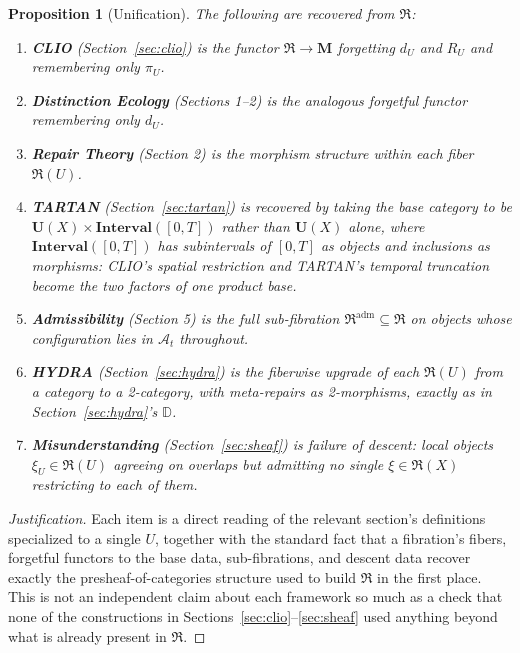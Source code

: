 \documentclass[11pt]{article}
\theoremstyle{plain}
\newtheorem{proposition}[theorem]{Proposition}
\theoremstyle{definition}
\theoremstyle{remark}
\begin{document}
\begin{proposition}[Unification]
\label{prop:unification}
The following are recovered from $\mathfrak{R}$:
\begin{enumerate}[itemsep=2pt]
\item \textbf{CLIO} (Section~\ref{sec:clio}) is the functor $\mathfrak{R} \to \mathbf{M}$ forgetting $d_U$ and $R_U$ and remembering only $\pi_U$.
\item \textbf{Distinction Ecology} (Sections 1--2) is the analogous forgetful functor remembering only $d_U$.
\item \textbf{Repair Theory} (Section 2) is the morphism structure within each fiber $\mathfrak{R}(U)$.
\item \textbf{TARTAN} (Section~\ref{sec:tartan}) is recovered by taking the base category to be $\mathbf{U}(X) \times \mathbf{Interval}([0,T])$ rather than $\mathbf{U}(X)$ alone, where $\mathbf{Interval}([0,T])$ has subintervals of $[0,T]$ as objects and inclusions as morphisms: CLIO's spatial restriction and TARTAN's temporal truncation become the two factors of one product base.
\item \textbf{Admissibility} (Section 5) is the full sub-fibration $\mathfrak{R}^{\mathrm{adm}} \subseteq \mathfrak{R}$ on objects whose configuration lies in $\mathcal{A}_t$ throughout.
\item \textbf{HYDRA} (Section~\ref{sec:hydra}) is the fiberwise upgrade of each $\mathfrak{R}(U)$ from a category to a 2-category, with meta-repairs as 2-morphisms, exactly as in Section~\ref{sec:hydra}'s $\mathbb{D}$.
\item \textbf{Misunderstanding} (Section~\ref{sec:sheaf}) is failure of descent: local objects $\xi_U \in \mathfrak{R}(U)$ agreeing on overlaps but admitting no single $\xi \in \mathfrak{R}(X)$ restricting to each of them.
\end{enumerate}
\end{proposition}
\begin{proof}[Justification]
Each item is a direct reading of the relevant section's definitions specialized to a single $U$, together with the standard fact that a fibration's fibers, forgetful functors to the base data, sub-fibrations, and descent data recover exactly the presheaf-of-categories structure used to build $\mathfrak{R}$ in the first place. This is not an independent claim about each framework so much as a check that none of the constructions in Sections~\ref{sec:clio}--\ref{sec:sheaf} used anything beyond what is already present in $\mathfrak{R}$.
\end{proof}
\end{document}

